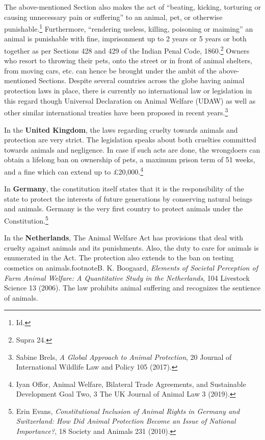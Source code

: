 \begin{multicols}{2}
\noi
The above-mentioned Section also makes the act of “beating, kicking, torturing or causing
unnecessary pain or suffering” to an animal, pet, or otherwise punishable.\footnote{Id.} Furthermore,
“rendering useless, killing, poisoning or maiming” an animal is punishable with fine,
imprisonment up to 2 years or 5 years or both together as per Sections 428 and 429 of the
Indian Penal Code, 1860.\footnote{Supra 24.} Owners who resort to throwing their pets, onto the street or in
front of animal shelters, from moving cars, etc. can hence be brought under the ambit of the
above-mentioned Sections. Despite several countries across the globe having animal
protection laws in place, there is currently no international law or legislation in this regard
though Universal Declaration on Animal Welfare (UDAW) as well as other similar
international treaties have been proposed in recent years.\footnote{Sabine Brels, \textit{A Global Approach to Animal Protection}, 20 Journal of International Wildlife Law and Policy 105 (2017).}


\noi
In the {\bf United Kingdom}, the laws regarding cruelty towards animals and protection are very
strict. The legislation speaks about both cruelties committed towards animals and negligence.
In case if such acts are done, the wrongdoers can obtain a lifelong ban on ownership of pets, a
maximum prison term of 51 weeks, and a fine which can extend up to £20,000.\footnote{Iyan Offor, Animal Welfare, Bilateral Trade Agreements, and Sustainable Development Goal Two, 3 The UK Journal of Animal Law 3 (2019).}

\noi
In {\bf Germany}, the constitution itself states that it is the responsibility of the state to protect the
interests of future generations by conserving natural beings and animals. Germany is the very
first country to protect animals under the Constitution.\footnote{Erin Evans, \textit{Constitutional Inclusion of Animal Rights in Germany and Switzerland: How Did Animal Protection Become an Issue of National Importance?}, 18 Society and Animals 231 (2010). }

\noi
In the {\bf Netherlands}, The Animal Welfare Act has provisions that deal with cruelty against
animals and its punishments. Also, the duty to care for animals is enumerated in the Act. The
protection also extends to the ban on testing cosmetics on animals.footnote{B. K. Boogaard, \textit{Elements of Societal Perception of Farm Animal Welfare: A Quantitative Study in the Netherlands}, 104 Livestock Science 13 (2006).} The law prohibits animal
suffering and recognizes the sentience of animals. 



\end{multicols}
